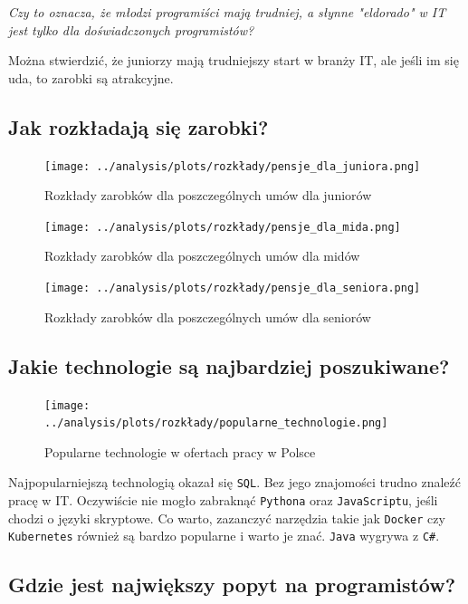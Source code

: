 \documentclass[a4paper]{article}
\begin{document}
\begin{center}
    \textit{Czy to oznacza, że młodzi programiści mają trudniej, a słynne "eldorado" w IT jest tylko dla doświadczonych programistów?}
\end{center}

\quad Można stwierdzić, że juniorzy mają trudniejszy start w branży IT, ale jeśli im się uda, to zarobki są atrakcyjne.


\subsection{Jak rozkładają się zarobki?}

\begin{figure}[H]
    \centering
    \texttt{[image: ../analysis/plots/rozkłady/pensje\_dla\_juniora.png]}
    \caption{Rozkłady zarobków dla poszczególnych umów dla juniorów}
\end{figure}

\begin{figure}[H]
    \centering
    \texttt{[image: ../analysis/plots/rozkłady/pensje\_dla\_mida.png]}
    \caption{Rozkłady zarobków dla poszczególnych umów dla midów}
\end{figure}

\begin{figure}[H]
    \centering
    \texttt{[image: ../analysis/plots/rozkłady/pensje\_dla\_seniora.png]}
    \caption{Rozkłady zarobków dla poszczególnych umów dla seniorów}
\end{figure}


\subsection{Jakie technologie są najbardziej poszukiwane?}

\begin{figure}[H]
    \centering
    \texttt{[image: ../analysis/plots/rozkłady/popularne\_technologie.png]}
    \caption{Popularne technologie w ofertach pracy w Polsce}
\end{figure}

\quad Najpopularniejszą technologią okazał się \texttt{SQL}. Bez jego znajomości trudno znaleźć pracę w IT. Oczywiście nie mogło zabraknąć \texttt{Pythona} oraz \texttt{JavaScriptu}, jeśli chodzi o języki skryptowe.
Co warto, zazanczyć narzędzia takie jak \texttt{Docker} czy \texttt{Kubernetes} również są bardzo popularne i warto je znać. \texttt{Java} wygrywa z \texttt{C\#}.

\subsection{Gdzie jest największy popyt na programistów?}
\end{document}
